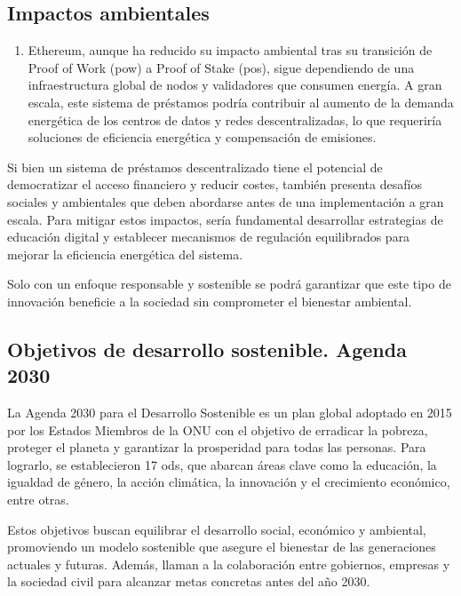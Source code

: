 \subsection{Impactos ambientales}
 
\begin{enumerate}
     \item Ethereum, aunque ha reducido su impacto ambiental tras su transición de Proof of Work (\gls{pow}) a Proof of Stake (\gls{pos}),
      sigue dependiendo de una infraestructura global de nodos y validadores que consumen energía.
       A gran escala, este sistema de préstamos podría contribuir al aumento de la demanda energética de los centros de datos y redes descentralizadas,
        lo que requeriría soluciones de eficiencia energética y compensación de emisiones.
 \end{enumerate}

 Si bien un sistema de préstamos descentralizado tiene el potencial de democratizar el acceso financiero y reducir costes,
  también presenta desafíos sociales y ambientales que deben abordarse antes de una implementación a gran escala.
   Para mitigar estos impactos, sería fundamental desarrollar estrategias de educación digital y
    establecer mecanismos de regulación equilibrados para  mejorar la eficiencia energética del sistema.

 Solo con un enfoque responsable y sostenible se podrá garantizar que este tipo de innovación beneficie a la sociedad sin comprometer
  el bienestar ambiental.

\subsection{Objetivos de desarrollo sostenible. Agenda 2030}
 La Agenda 2030 para el Desarrollo Sostenible es un plan global adoptado en 2015 por los Estados Miembros de la ONU con el objetivo de erradicar la pobreza, proteger el planeta y garantizar la prosperidad para todas las personas. Para lograrlo, se establecieron 17 \gls{ods}, que abarcan áreas clave como la educación, la igualdad de género, la acción climática, la innovación y el crecimiento económico, entre otras.

Estos objetivos buscan equilibrar el desarrollo social, económico y ambiental, promoviendo un modelo sostenible que asegure el bienestar de las generaciones actuales y futuras. Además, llaman a la colaboración entre gobiernos, empresas y la sociedad civil para alcanzar metas concretas antes del año 2030.


